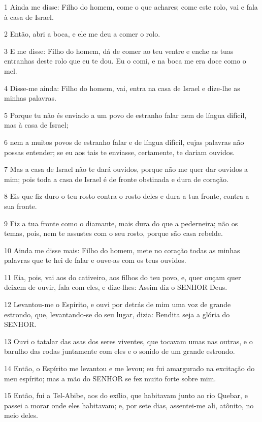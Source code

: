 \par 1 Ainda me disse: Filho do homem, come o que achares; come este rolo, vai e fala à casa de Israel.
\par 2 Então, abri a boca, e ele me deu a comer o rolo.
\par 3 E me disse: Filho do homem, dá de comer ao teu ventre e enche as tuas entranhas deste rolo que eu te dou. Eu o comi, e na boca me era doce como o mel.
\par 4 Disse-me ainda: Filho do homem, vai, entra na casa de Israel e dize-lhe as minhas palavras.
\par 5 Porque tu não és enviado a um povo de estranho falar nem de língua difícil, mas à casa de Israel;
\par 6 nem a muitos povos de estranho falar e de língua difícil, cujas palavras não possas entender; se eu aos tais te enviasse, certamente, te dariam ouvidos.
\par 7 Mas a casa de Israel não te dará ouvidos, porque não me quer dar ouvidos a mim; pois toda a casa de Israel é de fronte obstinada e dura de coração.
\par 8 Eis que fiz duro o teu rosto contra o rosto deles e dura a tua fronte, contra a sua fronte.
\par 9 Fiz a tua fronte como o diamante, mais dura do que a pederneira; não os temas, pois, nem te assustes com o seu rosto, porque são casa rebelde.
\par 10 Ainda me disse mais: Filho do homem, mete no coração todas as minhas palavras que te hei de falar e ouve-as com os teus ouvidos.
\par 11 Eia, pois, vai aos do cativeiro, aos filhos do teu povo, e, quer ouçam quer deixem de ouvir, fala com eles, e dize-lhes: Assim diz o SENHOR Deus.
\par 12 Levantou-me o Espírito, e ouvi por detrás de mim uma voz de grande estrondo, que, levantando-se do seu lugar, dizia: Bendita seja a glória do SENHOR.
\par 13 Ouvi o tatalar das asas dos seres viventes, que tocavam umas nas outras, e o barulho das rodas juntamente com eles e o sonido de um grande estrondo.
\par 14 Então, o Espírito me levantou e me levou; eu fui amargurado na excitação do meu espírito; mas a mão do SENHOR se fez muito forte sobre mim.
\par 15 Então, fui a Tel-Abibe, aos do exílio, que habitavam junto ao rio Quebar, e passei a morar onde eles habitavam; e, por sete dias, assentei-me ali, atônito, no meio deles.
